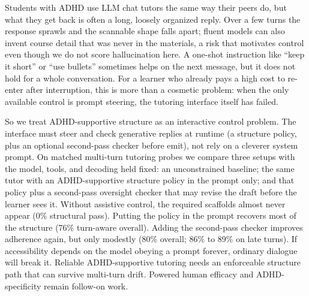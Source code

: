 Students with ADHD use LLM chat tutors the same way their peers do, but what
they get back is often a long, loosely organized reply. Over a few turns the
response sprawls and the scannable shape falls apart; fluent models can also
invent course detail that was never in the materials, a risk that motivates
control even though we do not score hallucination here. A one-shot instruction
like ``keep it short'' or ``use bullets'' sometimes helps on the next message,
but it does not hold for a whole conversation. For a learner who already pays
a high cost to re-enter after interruption, this is more than a cosmetic
problem: when the only available control is prompt steering, the tutoring
interface itself has failed.

So we treat ADHD-supportive structure as an interactive control problem. The
interface must steer and check generative replies at runtime (a structure
policy, plus an optional second-pass checker before emit), not rely on a
cleverer system prompt. On matched multi-turn tutoring probes we compare three
setups with the model, tools, and decoding held fixed: an unconstrained
baseline; the same tutor with an ADHD-supportive structure policy in the prompt
only; and that policy plus a second-pass oversight checker that may revise the
draft before the learner sees it. Without assistive control, the required
scaffolds almost never appear (0\% structural pass). Putting the policy in the
prompt recovers most of the structure (76\% turn-aware overall). Adding the
second-pass checker improves adherence again, but only modestly (80\% overall;
86\% to 89\% on late turns). If accessibility depends on the model obeying a
prompt forever, ordinary dialogue will break it. Reliable ADHD-supportive
tutoring needs an enforceable structure path that can survive multi-turn
drift. Powered human efficacy and ADHD-specificity remain follow-on work.
